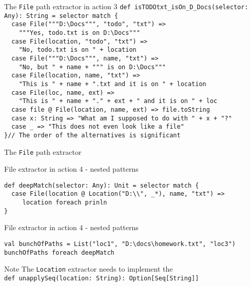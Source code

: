 \begin{frame}[fragile]{The \lstinline!File! path extractor in action 3}
\lstinline!def isTODOtxt_isOn_D_Docs(selector: Any): String = selector match {!\\
\lstinline!  case File("""D:\Docs""", "todo", "txt") =>!\\
\lstinline!    """Yes, todo.txt is on D:\Docs"""!\\
\lstinline!  case File(location, "todo", "txt") =>!\\
\lstinline!    "No, todo.txt is on " + location!\\
\lstinline!  case File("""D:\Docs""", name, "txt") =>!\\
\lstinline!    "No, but " + name + """ is on D:\Docs"""!\\
\lstinline!  case File(location, name, "txt") =>!\\
\lstinline!    "This is " + name + ".txt and it is on " + location!\\
\lstinline!  case File(loc, name, ext) =>!\\
\lstinline!    "This is " + name + "." + ext + " and it is on " + loc!\\ 
\lstinline!  case file @ File(location, name, ext) => file.toString!\\
\lstinline!  case x: String => "What am I supposed to do with " + x + "?"!\\
\lstinline!  case _ => "This does not even look like a file"!\\
\lstinline!}!\lstinline!// The order of the alternatives is significant!
\end{frame}

\begin{frame}[fragile]{The \lstinline!File! path extractor}
\begin{exampleblock}{File extractor in action 4 - nested patterns}
\begin{lstlisting}
def deepMatch(selector: Any): Unit = selector match {
  case File(location @ Location("D:\\", _*), name, "txt") =>
     location foreach prinln
}
\end{lstlisting}
\end{exampleblock}
\pause
\begin{exampleblock}{File extractor in action 4 - nested patterns}
\begin{lstlisting}
val bunchOfPaths = List("loc1", "D:\docs\homework.txt", "loc3")
bunchOfPaths foreach deepMatch
\end{lstlisting}
\end{exampleblock}
\pause
\begin{block}{Note}
The \lstinline!Location! extractor needs to implement the\\
\lstinline!def unapplySeq(location: String): Option[Seq[String]]!
\end{block}
\end{frame}

